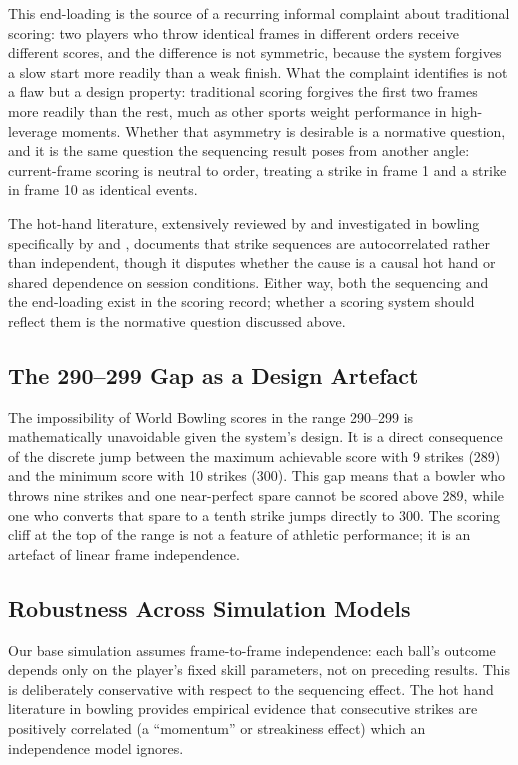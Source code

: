 \documentclass[USenglish]{article}
\theoremstyle{dgthm}
\theoremstyle{dgdef}
\begin{document}
This end-loading is the source of a recurring informal complaint about traditional scoring: two players who throw identical frames in different orders receive different scores, and the difference is not symmetric, because the system forgives a slow start more readily than a weak finish. What the complaint identifies is not a flaw but a design property: traditional scoring forgives the first two frames more readily than the rest, much as other sports weight performance in high-leverage moments. Whether that asymmetry is desirable is a normative question, and it is the same question the sequencing result poses from another angle: current-frame scoring is neutral to order, treating a strike in frame 1 and a strike in frame 10 as identical events.

The hot-hand literature, extensively reviewed by \citet{bareli2006} and investigated in bowling specifically by \citet{yaari2012} and \citet{dorseypalmateer2004}, documents that strike sequences are autocorrelated rather than independent, though it disputes whether the cause is a causal hot hand or shared dependence on session conditions. Either way, both the sequencing and the end-loading exist in the scoring record; whether a scoring system should reflect them is the normative question discussed above.

\subsection{The 290--299 Gap as a Design Artefact}

The impossibility of World Bowling scores in the range 290--299 is mathematically unavoidable given the system's design. It is a direct consequence of the discrete jump between the maximum achievable score with 9 strikes (289) and the minimum score with 10 strikes (300). This gap means that a bowler who throws nine strikes and one near-perfect spare cannot be scored above 289, while one who converts that spare to a tenth strike jumps directly to 300. The scoring cliff at the top of the range is not a feature of athletic performance; it is an artefact of linear frame independence.

\subsection{Robustness Across Simulation Models}

Our base simulation assumes frame-to-frame independence: each ball's outcome depends only on the player's fixed skill parameters, not on preceding results. This is deliberately conservative with respect to the sequencing effect. The hot hand literature in bowling \citep{yaari2012,dorseypalmateer2004} provides empirical evidence that consecutive strikes are positively correlated (a ``momentum'' or streakiness effect) which an independence model ignores.
\end{document}
